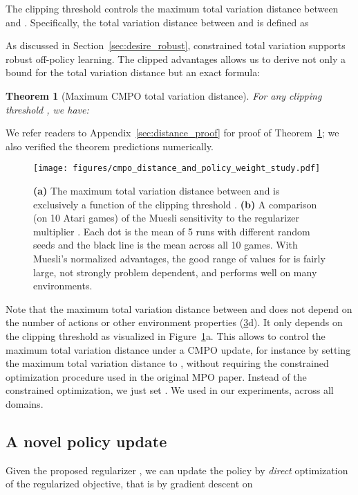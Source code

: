 \documentclass{article}
\newcommand{\desireRobust}[1]{(\hyperref[table-desiderata]{3}#1)}
\newtheorem{theorem}{Theorem}[section]
\begin{document}
The clipping threshold  controls the maximum total variation distance between  and . Specifically, the total variation distance between  and  is defined as

As discussed in Section~\ref{sec:desire_robust}, constrained total variation supports robust off-policy learning. The clipped advantages allows us to derive not only a bound for the total variation distance
but an exact formula:
\begin{theorem}[Maximum CMPO total variation distance]
For any clipping threshold , we have:

\vspace{-0.2in}
\label{theorem}
\end{theorem}
We refer readers to Appendix~\ref{sec:distance_proof} for proof of Theorem~\ref{theorem}; we also verified the theorem predictions numerically.

\begin{figure}[t]
\vskip 0.01in
\begin{center}
\centerline{\texttt{[image: figures/cmpo\_distance\_and\_policy\_weight\_study.pdf]}}
\vskip -0.1in
\caption{\textbf{(a)} The maximum total variation distance between  and  is exclusively a function of the clipping threshold . \textbf{(b)} A comparison (on 10 Atari games) of the Muesli sensitivity to the regularizer multiplier . Each dot is the mean of 5 runs with different random seeds and the black line is the mean across all 10 games. With Muesli's normalized advantages, the good range of values for  is fairly large, not strongly problem dependent, and  performs well on many environments.
}
\label{fig:cmpo_distance_and_policy_weight_study}
\end{center}
\vskip -0.3in
\end{figure}

Note that the maximum total variation distance between  and  does not depend on the number of actions or other environment properties \desireRobust{d}. It only depends on the clipping threshold as visualized in Figure~\ref{fig:cmpo_distance_and_policy_weight_study}a. This allows to control the maximum total variation distance under a CMPO update, for instance by setting the maximum total variation distance to , without requiring the constrained optimization procedure used in the original MPO paper. Instead of the constrained optimization, we just set . We used  in our experiments, across all domains.

\subsection{A novel policy update}\label{pg_cmpo}
Given the proposed regularizer , we can update the policy by \emph{direct} optimization of the regularized objective, that is by gradient descent on
\end{document}
